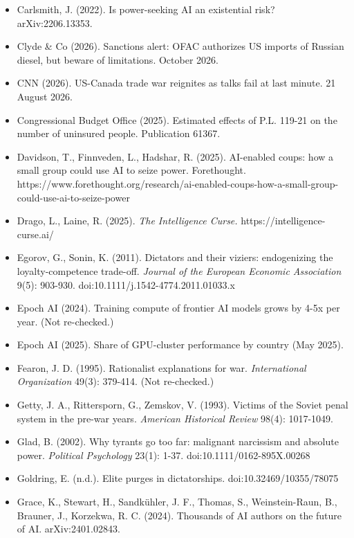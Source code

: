 \documentclass[
  10pt,
]{article}
\begin{document}
\begin{itemize}
  Burger, J. M. (2009). Replicating Milgram: would people still obey today? \emph{American
  Psychologist} 64(1): 1-11. doi:10.1037/a0010932
\item
  Carlsmith, J. (2022). Is power-seeking AI an existential risk? arXiv:2206.13353.
\item
  Clyde \& Co (2026). Sanctions alert: OFAC authorizes US imports of Russian diesel, but beware of
  limitations. October 2026.
\item
  CNN (2026). US-Canada trade war reignites as talks fail at last minute. 21 August 2026.
\item
  Congressional Budget Office (2025). Estimated effects of P.L. 119-21 on the number of uninsured
  people. Publication 61367.
\item
  Davidson, T., Finnveden, L., Hadshar, R. (2025). AI-enabled coups: how a small group could use AI
  to seize power. Forethought.
  https://www.forethought.org/research/ai-enabled-coups-how-a-small-group-could-use-ai-to-seize-power
\item
  Drago, L., Laine, R. (2025). \emph{The Intelligence Curse.} https://intelligence-curse.ai/
\item
  Egorov, G., Sonin, K. (2011). Dictators and their viziers: endogenizing the loyalty-competence
  trade-off. \emph{Journal of the European Economic Association} 9(5): 903-930.
  doi:10.1111/j.1542-4774.2011.01033.x
\item
  Epoch AI (2024). Training compute of frontier AI models grows by 4-5x per year. (Not re-checked.)
\item
  Epoch AI (2025). Share of GPU-cluster performance by country (May 2025).
\item
  Fearon, J. D. (1995). Rationalist explanations for war. \emph{International Organization} 49(3):
  379-414. (Not re-checked.)
\item
  Getty, J. A., Rittersporn, G., Zemskov, V. (1993). Victims of the Soviet penal system in the
  pre-war years. \emph{American Historical Review} 98(4): 1017-1049.
\item
  Glad, B. (2002). Why tyrants go too far: malignant narcissism and absolute power. \emph{Political
  Psychology} 23(1): 1-37. doi:10.1111/0162-895X.00268
\item
  Goldring, E. (n.d.). Elite purges in dictatorships. doi:10.32469/10355/78075
\item
  Grace, K., Stewart, H., Sandkühler, J. F., Thomas, S., Weinstein-Raun, B., Brauner, J., Korzekwa,
  R. C. (2024). Thousands of AI authors on the future of AI. arXiv:2401.02843.

\end{itemize}
\end{document}
